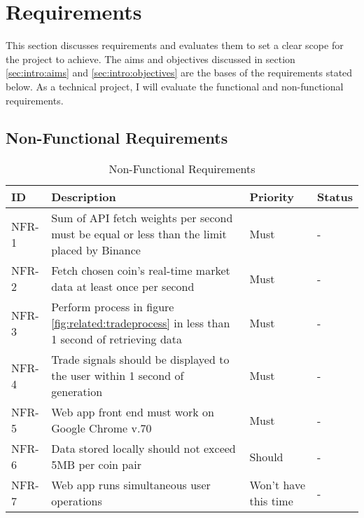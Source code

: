 %
\chapter{Requirements}
\label{sec:requirements}


This section discusses requirements and evaluates them to set a clear scope for the project to achieve. The aims and objectives discussed in section \ref{sec:intro:aims} and \ref{sec:intro:objectives} are the bases of the requirements stated below. As a technical project, I will evaluate the functional and non-functional requirements.



\section{Non-Functional Requirements}
\label{sec:requirements:non_func}


\begin{table}[htb!]
\centering
\begin{tabular}{|l|p{}|l|l|}
\hline
\textbf{ID} & \textbf{Description} & \textbf{Priority} & \textbf{Status} \\ \hline\hline
NFR-1 & Sum of API fetch weights per second must be equal or less than the limit placed by Binance & Must & - \\ \hline
NFR-2 & Fetch chosen coin's real-time market data at least once per second & Must & - \\ \hline
NFR-3 & Perform process in figure \ref{fig:related:tradeprocess} in less than 1 second of retrieving data & Must & - \\ \hline
NFR-4 & Trade signals should be displayed to the user within 1 second of generation & Must & - \\\hline
NFR-5 & Web app front end must work on Google Chrome v.70 & Must & - \\\hline
NFR-6 & Data stored locally should not exceed 5MB per coin pair & Should & - \\ \hline
NFR-7 & Web app runs simultaneous user operations & Won't have this time & - \\\hline
\end{tabular}
\caption{Non-Functional Requirements}
\label{table:requirements:non_func}
\end{table}

